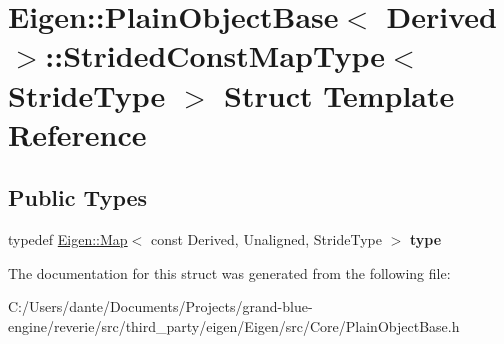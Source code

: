 \hypertarget{struct_eigen_1_1_plain_object_base_1_1_strided_const_map_type}{}\section{Eigen\+::Plain\+Object\+Base$<$ Derived $>$\+::Strided\+Const\+Map\+Type$<$ Stride\+Type $>$ Struct Template Reference}
\label{struct_eigen_1_1_plain_object_base_1_1_strided_const_map_type}
\subsection*{Public Types}
\begin{DoxyCompactItemize}
\item 
\mbox{\label{struct_eigen_1_1_plain_object_base_1_1_strided_const_map_type_a0219be33d5d936ea7f75c64a53720f43}} 
typedef \mbox{\hyperlink{class_eigen_1_1_map}{Eigen\+::\+Map}}$<$ const Derived, Unaligned, Stride\+Type $>$ {\bfseries type}
\end{DoxyCompactItemize}


The documentation for this struct was generated from the following file\+:\begin{DoxyCompactItemize}
\item 
C\+:/\+Users/dante/\+Documents/\+Projects/grand-\/blue-\/engine/reverie/src/third\+\_\+party/eigen/\+Eigen/src/\+Core/Plain\+Object\+Base.\+h\end{DoxyCompactItemize}
